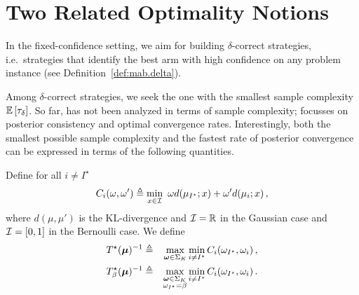 \section{Two Related Optimality Notions}\label{sec:related}

In the fixed-confidence setting, we aim for building $\delta$-correct strategies, i.e.\ strategies that identify the best arm with high confidence on any problem instance (see Definition~\ref{def:mab.delta}). 


Among $\delta$-correct strategies, we seek the one with the smallest sample complexity $\mathbb{E}\left[\tau_\delta\right]$. So far, \TTTS has not been analyzed in terms of sample complexity; \citet{russo2016ttts} focusses on posterior consistency and optimal convergence rates. Interestingly, both the smallest possible sample complexity and the fastest rate of posterior convergence can be expressed in terms of the following quantities.





\begin{definition}\label{def:t3c.transportation}
\begin{leftbar}[defnbar]
Define for all $i\neq I^\star$
\[
    C_i(\omega,\omega') \triangleq \min_{x\in \mathcal{I}} \ \omega d(\mu_{I^\star};x) + \omega' d(\mu_i;x)\,,
\]
where $d(\mu,\mu')$ is the KL-divergence and $\mathcal{I} = \mathbb{R}$ in the Gaussian case and $\mathcal{I} = [0,1]$ in the Bernoulli case. We define
\begin{eqnarray}
    T^\star({\boldsymbol \mu})^{-1} &\triangleq& \max_{{\boldsymbol \omega} \in \Sigma_K}\min_{i\neq I^\star} C_i(\omega_{I^\star},\omega_i)\,,\nonumber\\
    T_{\beta}^\star({\boldsymbol \mu})^{-1} &\triangleq& \max_{\substack{{\boldsymbol \omega} \in \Sigma_K\\\omega_{I^\star}=\beta}}\min_{i\neq I^\star} C_i(\omega_{I^\star},\omega_i)\,.\label{def:GammaBeta}\end{eqnarray}
\end{leftbar}
\end{definition}

